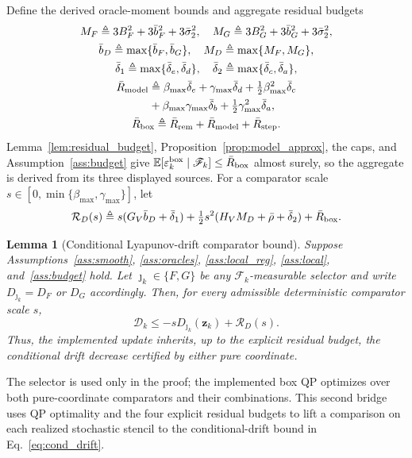 \documentclass{article}
\newtheorem{lemma}{Lemma}
\theoremstyle{remark}
\newcommand{\E}{\mathbb{E}}
\newcommand{\bz}{\boldsymbol{z}}
\begin{document}
Define the derived oracle-moment bounds and aggregate residual budgets
\[
\begin{gathered}
M_F\triangleq3B_F^2+3\bar b_F^2+3\bar\sigma_2^2,
\quad
M_G\triangleq3B_G^2+3\bar b_G^2+3\bar\sigma_2^2,\\
\bar b_D\triangleq\max\{\bar b_F,\bar b_G\},
\quad
M_D\triangleq\max\{M_F,M_G\},\\
\bar\delta_1\triangleq\max\{\bar\delta_e,\bar\delta_d\},
\quad
\bar\delta_2\triangleq\max\{\bar\delta_c,\bar\delta_a\},\\
\bar R_{\rm model}\triangleq{}
\beta_{\max}\bar\delta_e+\gamma_{\max}\bar\delta_d
+\tfrac12\beta_{\max}^2\bar\delta_c\\
\quad{}+\beta_{\max}\gamma_{\max}\bar\delta_b
+\tfrac12\gamma_{\max}^2\bar\delta_a,\\
\bar R_{\rm box}\triangleq\bar R_{\rm rem}+\bar R_{\rm model}+\bar R_{\rm step}.
\end{gathered}
\]
Lemma~\ref{lem:residual_budget}, Proposition~\ref{prop:model_approx}, the caps, and Assumption~\ref{ass:budget} give $\E[\varepsilon_k^{\rm box}\mid\mathscr F_k]\le\bar R_{\rm box}$ almost surely, so the aggregate is derived from its three displayed sources.
For a comparator scale $s\in[0,\min\{\beta_{\max},\gamma_{\max}\}]$, let
\begin{equation}\label{eq:R_direction}
\mathcal R_D(s)
\triangleq
s(G_V\bar b_D+\bar\delta_1)
+\tfrac12s^2(H_VM_D+\bar\rho+\bar\delta_2)
+\bar R_{\rm box}.
\end{equation}

\begin{lemma}[Conditional Lyapunov-drift comparator bound]\label{lem:cond_drift}
Suppose Assumptions~\ref{ass:smooth}, \ref{ass:oracles}, \ref{ass:local_reg}, \ref{ass:local}, and~\ref{ass:budget} hold.
Let $\jmath_k\in\{F,G\}$ be any $\mathscr F_k$-measurable selector and write $D_{\jmath_k}=D_F$ or $D_G$ accordingly.
Then, for every admissible deterministic comparator scale $s$,
\begin{equation}\label{eq:cond_drift}
\mathscr D_k
\le
-sD_{\jmath_k}(\bz_k)
+\mathcal R_D(s).
\end{equation}
Thus, the implemented update inherits, up to the explicit residual budget, the conditional drift decrease certified by either pure coordinate.
\end{lemma}

The selector is used only in the proof; the implemented box QP optimizes over both pure-coordinate comparators and their combinations.
This second bridge uses QP optimality and the four explicit residual budgets to lift a comparison on each realized stochastic stencil to the conditional-drift bound in Eq.~\eqref{eq:cond_drift}.
\end{document}
